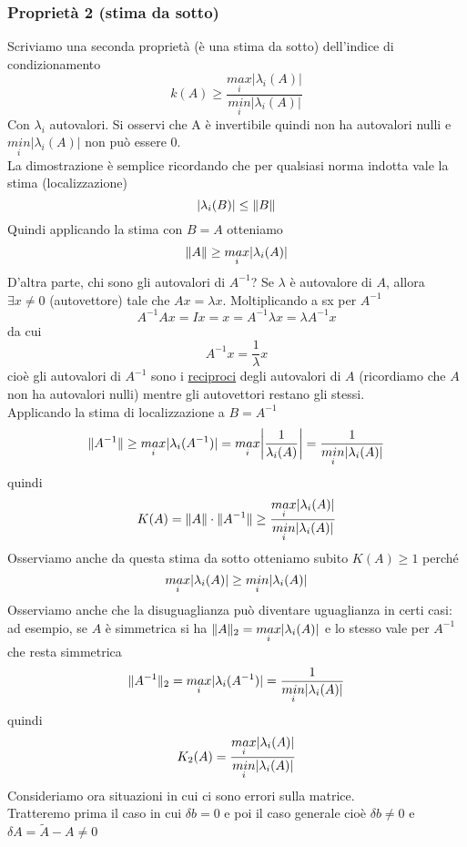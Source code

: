 \documentclass[12pt,a4paper]{article}
\DeclarePairedDelimiter{\abs}{\lvert}{\rvert}
\DeclarePairedDelimiter{\norma}{\lVert}{\rVert}
\begin{document}
\subsubsection{Proprietà 2 (stima da sotto)}
Scriviamo una seconda proprietà (è una stima da sotto) dell'indice di condizionamento
\begin{equation*}
    k(A)\geq\frac{\underset{i}{max}|\lambda_i(A)|}{\underset{i}{min}|\lambda_i(A)|}
\end{equation*}
Con $\lambda_i$ autovalori. Si osservi che A è invertibile quindi non ha autovalori nulli e $\underset{i}{min}|\lambda_i(A)|$ non può essere 0.\\La dimostrazione è semplice ricordando che per qualsiasi norma indotta vale la stima (localizzazione)
\begin{equation*}
    |\lambda_i(B)|\leq\norma{B}
\end{equation*}
Quindi applicando la stima con $B=A$ otteniamo
\begin{equation*}
    \norma{A}\geq\underset{i}{max}|\lambda_i(A)|
\end{equation*}
D'altra parte, chi sono gli autovalori di $A^{-1}$? Se $\lambda$ è autovalore di $A$, allora $\exists x \neq 0$ (autovettore) tale che $Ax=\lambda x$. Moltiplicando a sx per $A^{-1}$
\begin{equation*}
    A^{-1}Ax=Ix=x=A^{-1}\lambda x=\lambda A^{-1}x
\end{equation*}
da cui
\begin{equation*}
    A^{-1}x=\frac{1}{\lambda}x
\end{equation*}
cioè gli autovalori di $A^{-1}$ sono i \uline{reciproci} degli autovalori di $A$ (ricordiamo che $A$ non ha autovalori nulli) mentre gli autovettori restano gli stessi.\\
Applicando la stima di localizzazione a $B = A^{-1}$
\[
\norma{A^{-1}} \ge \underset{i}{max} \abs{\lambda_i (A^{-1})} = \underset{i}{max} \abs*{\frac{1}{\lambda_i (A)}} = \frac{1}{\underset{i}{min} \abs{\lambda_i(A)}}
\]
quindi
\[
K(A) = \norma{A} \cdot \norma{A^{-1}} \ge \frac{\underset{i}{max} \abs{\lambda_i (A)}}{\underset{i}{min} \abs{\lambda_i (A)}}
\]
Osserviamo anche da questa stima da sotto otteniamo subito $K(A) \ge 1$ perché
\[
\underset{i}{max} \abs{\lambda_i(A)} \ge \underset{i}{min} \abs{\lambda_i(A)}
\]
Osserviamo anche che la disuguaglianza può diventare uguaglianza in certi casi: ad esempio, se $A$ è simmetrica si ha $\norma{A}_2 = \underset{i}{max} \abs{\lambda_i (A)}$ e lo stesso vale per $A^{-1}$ che resta simmetrica
\[
\norma{A^{-1}}_2 = \underset{i}{max} \abs{\lambda_i (A^{-1})} = \frac{1}{\underset{i}{min} \abs{\lambda_i(A)}}
\]
quindi
\[
K_2 (A) = \frac{\underset{i}{max} \abs{\lambda_i (A)}}{\underset{i}{min} \abs{\lambda_i (A)}}
\]
Consideriamo ora situazioni in cui ci sono errori sulla matrice.\\
Tratteremo prima il caso in cui $\delta b = 0$ e poi il caso generale cioè $\delta b \neq 0$ e $\delta A = \tilde{A} - A \neq 0$
\end{document}
